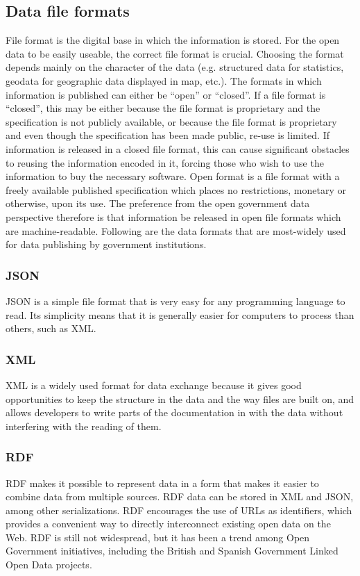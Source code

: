 \documentclass[thesis=B,english]{FITthesis}[2012/06/26]
\begin{document}
	\subsection{Data file formats}
	 File format is the digital base in which the information is stored. For the open data to be easily useable, the correct file format is crucial. Choosing the format depends mainly on the character of the data (e.g. structured data for statistics, geodata for geographic data displayed in map, etc.). The formats in which information is published can either be “open” or “closed”. If a file format is “closed”, this may be either because the file format is proprietary and the specification is not publicly available, or because the file format is proprietary and even though the specification has been made public, re-use is limited. If information is released in a closed file format, this can cause significant obstacles to reusing the information encoded in it, forcing those who wish to use the information to buy the necessary software. Open format is a file format with a freely available published specification which places no restrictions, monetary or otherwise, upon its use. The preference from the open government data perspective therefore is that information be released in open file formats which are machine-readable. Following are the data formats that are most-widely used for data publishing by government institutions.\cite{opendatahandbookfileformats}
	 
	 	\subsubsection*{JSON}
	 	JSON is a simple file format that is very easy for any programming language to read. Its simplicity means that it is generally easier for computers to process than others, such as XML.
	 	\subsubsection*{XML}
	 	XML is a widely used format for data exchange because it gives good opportunities to keep the structure in the data and the way files are built on, and allows developers to write parts of the documentation in with the data without interfering with the reading of them.
	 	\subsubsection*{RDF} 	
		RDF makes it possible to represent data in a form that makes it easier to combine data from multiple sources. RDF data can be stored in XML and JSON, among other serializations. RDF encourages the use of URLs as identifiers, which provides a convenient way to directly interconnect existing open data on the Web. RDF is still not widespread, but it has been a trend among Open Government initiatives, including the British and Spanish Government Linked Open Data projects.
\end{document}

